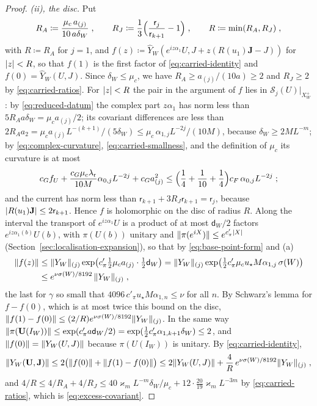 \documentclass[11pt]{preprint}
\DeclarePairedDelimiter{\abs}{\lvert}{\rvert}
\DeclarePairedDelimiter{\norm}{\lVert}{\rVert}
\numberwithin{equation}{section}
\theoremstyle{definition}
\theoremstyle{remark}
\theoremstyle{plain}
\begin{document}
\begin{proof}
\emph{(ii), the disc.} Put
\[
    R_A \coloneqq \frac{\mu_c\,a_{(j)}}{10\,a\delta_W}\;,
    \qquad
    R_J \coloneqq \frac13\Bigl(\frac{\mathsf r_j}{\mathsf r_{k+1}} - 1\Bigr)\;,
    \qquad
    R \coloneqq \min(R_A, R_J)\;,
\]
with $R \coloneqq R_A$ for $j = 1$, and $f(z) \coloneqq \hat Y_W(e^{iz\alpha_1}U, J + z(R(u_1)\mathbf J - J))$ for $\abs z < R$, so that $f(1)$ is the first factor of \eqref{eq:carried-identity} and $f(0) = \hat Y_W(U, J)$. Since $\delta_W \leq \mu_c$, we have $R_A \geq a_{(j)}/(10a) \geq 2$ and $R_J \geq 2$ by \eqref{eq:carried-ratios}. For $\abs z < R$ the pair in the argument of $f$ lies in $\mathcal S_j(U)|_{X^+_W}$: by \eqref{eq:reduced-datum} the complex part $z\alpha_1$ has norm less than $5R_Aa\delta_W = \mu_ca_{(j)}/2$; its covariant differences are less than $2R_Aa_2 = \mu_ca_{(j)}L^{-(k+1)}/(5\delta_W) \leq \mu_c\,\alpha_{1,j}L^{-2j}/(10M)$, because $\delta_W \geq 2ML^{-m}$; by \eqref{eq:complex-curvature}, \eqref{eq:carried-smallness}, and the definition of $\mu_c$ its curvature is at most
\[
    c_Gf_U + \frac{c_G\mu_c\lambda_{\mathrm r}}{10M}\alpha_{0,j}L^{-2j} + c_Ga_{(j)}^2 \leq \Bigl(\frac14 + \frac{1}{10} + \frac14\Bigr)c_F\,\alpha_{0,j}L^{-2j}\;;
\]
and the current has norm less than $\mathsf r_{k+1} + 3R_J\mathsf r_{k+1} = \mathsf r_j$, because $\abs{R(u_1)\mathbf J} \leq 2\mathsf r_{k+1}$. Hence $f$ is holomorphic on the disc of radius $R$. Along the interval the transport of $e^{iz\alpha_1}U$ is a product of at most $\mathsf d_W/2$ factors $e^{iz\alpha_1(b)}U(b)$, with $\pi(U(b))$ unitary and $\norm{\pi(e^{iX})} \leq e^{c'_\pi\abs X}$ (Section~\ref{sec:localisation-expansion}), so that by \eqref{eq:base-point-form} and (a)
\begin{align*}
    \norm{f(z)} &\leq \norm{Y_W}_{(j)}\exp\bigl(c'_\pi\tfrac12\mu_ca_{(j)} \cdot \tfrac12\mathsf d_W\bigr) = \norm{Y_W}_{(j)}\exp\bigl(\tfrac12c'_\pi\mu_cu_\star M\alpha_{1,j}\,\sigma(W)\bigr)\\
    &\leq e^{\nu\sigma(W)/8192}\,\norm{Y_W}_{(j)}\;,
\end{align*}
the last for $\gamma$ so small that $4096\,c'_\pi u_\star M\alpha_{1,n} \leq \nu$ for all $n$. By Schwarz's lemma for $f - f(0)$, which is at most twice this bound on the disc, $\norm{f(1) - f(0)} \leq (2/R)e^{\nu\sigma(W)/8192}\norm{Y_W}_{(j)}$. In the same way $\norm{\pi(\mathbf U(I_W))} \leq \exp(c'_\pi a\mathsf d_W/2) = \exp(\frac12c'_\pi\alpha_{1,k+1}\delta_W) \leq 2$, and $\norm{f(0)} = \norm{Y_W(U, J)}$ because $\pi(U(I_W))$ is unitary. By \eqref{eq:carried-identity},
\[
    \norm{Y_W(\mathbf U, \mathbf J)} \leq 2\bigl(\norm{f(0)} + \norm{f(1) - f(0)}\bigr) \leq 2\norm{Y_W(U, J)} + \frac4R\,e^{\nu\sigma(W)/8192}\norm{Y_W}_{(j)}\;,
\]
and $4/R \leq 4/R_A + 4/R_J \leq 40\varkappa_mL^{-m}\delta_W/\mu_c + 12 \cdot \frac{20}{19}\varkappa_mL^{-3m}$ by \eqref{eq:carried-ratios}, which is \eqref{eq:excess-covariant}.
\end{proof}
\end{document}
